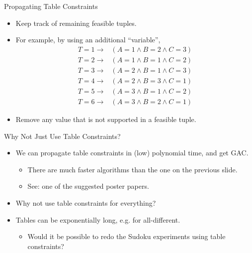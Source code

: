 \documentclass[aspectratio=169,compress,10pt]{beamer}
\begin{document}
\begin{frame}{Propagating Table Constraints}
    \begin{itemize}
        \item Keep track of remaining feasible tuples.
        \item For example, by using an additional ``variable'', \begin{align*}
                T = 1 \rightarrow{} &(A = 1 \land B = 2 \land C = 3) \\
                T = 2 \rightarrow{} &(A = 1 \land B = 1 \land C = 2) \\
                T = 3 \rightarrow{} &(A = 2 \land B = 1 \land C = 3) \\
                T = 4 \rightarrow{} &(A = 2 \land B = 3 \land C = 1) \\
                T = 5 \rightarrow{} &(A = 3 \land B = 1 \land C = 2) \\
                T = 6 \rightarrow{} &(A = 3 \land B = 2 \land C = 1)
        \end{align*}
        \item Remove any value that is not supported in a feasible tuple.
    \end{itemize}
\end{frame}

\begin{frame}{Why Not Just Use Table Constraints?}
    \begin{itemize}
        \item We can propagate table constraints in (low) polynomial time, and get GAC.
            \begin{itemize}
                \item There are much faster algorithms than the one on the
                    previous slide.
                \item See: one of the suggested poster papers.
            \end{itemize}
        \item Why not use table constraints for everything?
        \item <2-> Tables can be exponentially long, e.g. for all-different.
            \begin{itemize}
                \item <2-> Would it be possible to redo the Sudoku experiments
                    using table constraints?
            \end{itemize}
    \end{itemize}
\end{frame}
\end{document}
